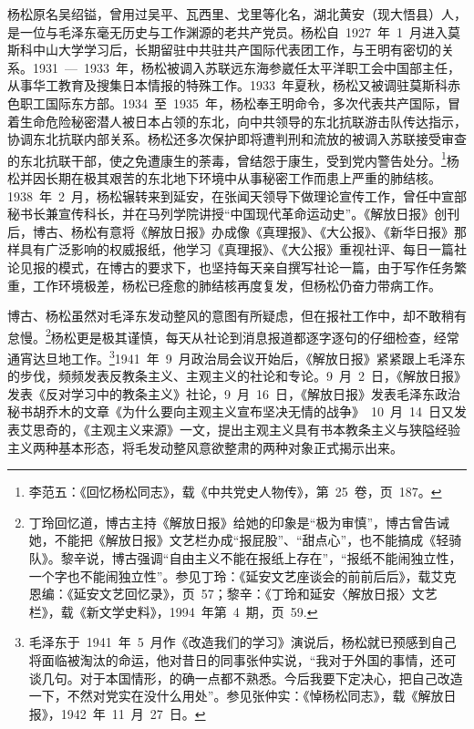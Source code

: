杨松原名吴绍镒，曾用过吴平、瓦西里、戈里等化名，湖北黄安（现大悟县）人，是一位与毛泽东毫无历史与工作渊源的老共产党员。杨松自~1927~年~1~月进入莫斯科中山大学学习后，长期留驻中共驻共产国际代表团工作，与王明有密切的关系。1931~—~1933~年，杨松被调入苏联远东海参崴任太平洋职工会中国部主任，从事华工教育及搜集日本情报的特殊工作。1933~年夏秋，杨松又被调驻莫斯科赤色职工国际东方部。1934~至~1935~年，杨松奉王明命令，多次代表共产国际，冒着生命危险秘密潜人被日本占领的东北，向中共领导的东北抗联游击队传达指示，协调东北抗联内部关系。杨松还多次保护即将遭判刑和流放的被调入苏联接受审查的东北抗联干部，使之免遭康生的荼毒，曾结怨于康生，受到党内警告处分。\footnote{李范五：《回忆杨松同志》，载《中共党史人物传》，第~25~卷，页~187。}杨松并因长期在极其艰苦的东北地下环境中从事秘密工作而患上严重的肺结核。1938~年~2~月，杨松辗转来到延安，在张闻天领导下做理论宣传工作，曾任中宣部秘书长兼宣传科长，并在马列学院讲授“中国现代革命运动史”。《解放日报》创刊后，博古、杨松有意将《解放日报》办成像《真理报》、《大公报》、《新华日报》那样具有广泛影响的权威报纸，他学习《真理报》、《大公报》重视社评、每日一篇社论见报的模式，在博古的要求下，也坚持每天亲自撰写社论一篇，由于写作任务繁重，工作环境极差，杨松已痊愈的肺结核再度复发，但杨松仍奋力带病工作。

博古、杨松虽然对毛泽东发动整风的意图有所疑虑，但在报社工作中，却不敢稍有怠慢。\footnote{丁玲回忆道，博古主持《解放日报》给她的印象是“极为审慎”，博古曾告诫她，不能把《解放日报》文艺栏办成“报屁股”、“甜点心”，也不能搞成《轻骑队》。黎辛说，博古强调“自由主义不能在报纸上存在”，“报纸不能闹独立性，一个字也不能闹独立性”。参见丁玲：《延安文艺座谈会的前前后后》，载艾克恩编：《延安文艺回忆录》，页~57；黎辛：《丁玲和延安〈解放日报〉文艺栏》，载《新文学史料》，1994~年第~4~期，页~59.}杨松更是极其谨慎，每天从社论到消息报道都逐字逐句的仔细检查，经常通宵达旦地工作。\footnote{毛泽东于~1941~年~5~月作《改造我们的学习》演说后，杨松就已预感到自己将面临被淘汰的命运，他对昔日的同事张仲实说，“我对于外国的事情，还可谈几句。对于本国情形，的确一点都不熟悉。今后我要下定决心，把自己改造一下，不然对党实在没什么用处”。参见张仲实：《悼杨松同志》，载《解放日报》，1942~年~11~月~27~日。}1941~年~9~月政治局会议开始后，《解放日报》紧紧跟上毛泽东的步伐，频频发表反教条主义、主观主义的社论和专论。9~月~2~日，《解放日报》发表《反对学习中的教条主义》社论，9~月~16~日，《解放日报》发表毛泽东政治秘书胡乔木的文章《为什么要向主观主义宣布坚决无情的战争》~10~月~14~日又发表艾思奇的，《主观主义来源》一文，提出主观主义具有书本教条主义与狭隘经验主义两种基本形态，将毛发动整风意欲整肃的两种对象正式揭示出来。

